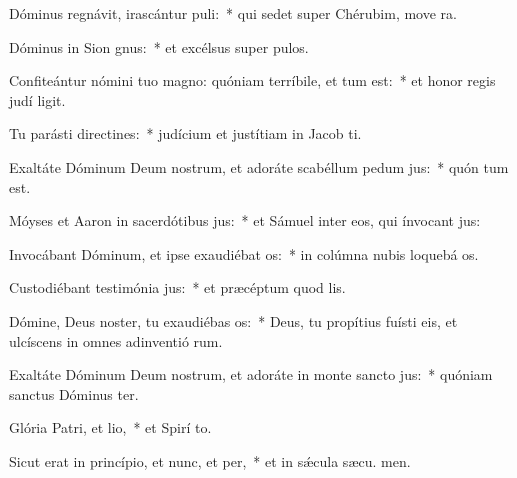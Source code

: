 \item Dóminus regnávit, irascántur puli:~* qui sedet super Chérubim, move ra.
\item Dóminus in Sion gnus:~* et excélsus super  pulos.
\item Confiteántur nómini tuo magno: quóniam terríbile, et tum est:~* et honor regis judí ligit.
\item Tu parásti directines:~* judícium et justítiam in Jacob  ti.
\item Exaltáte Dóminum Deum nostrum, et adoráte scabéllum pedum jus:~* quón tum est.
\item Móyses et Aaron in sacerdótibus jus:~* et Sámuel inter eos, qui ínvocant  jus:
\item Invocábant Dóminum, et ipse exaudiébat os:~* in colúmna nubis loquebá  os.
\item Custodiébant testimónia jus:~* et præcéptum quod  lis.
\item Dómine, Deus noster, tu exaudiébas os:~* Deus, tu propítius fuísti eis, et ulcíscens in omnes adinventió rum.
\item Exaltáte Dóminum Deum nostrum, et adoráte in monte sancto jus:~* quóniam sanctus Dóminus  ter.
\item Glória Patri, et lio,~* et Spirí to.
\item Sicut erat in princípio, et nunc, et per,~* et in sǽcula sæcu. men.
